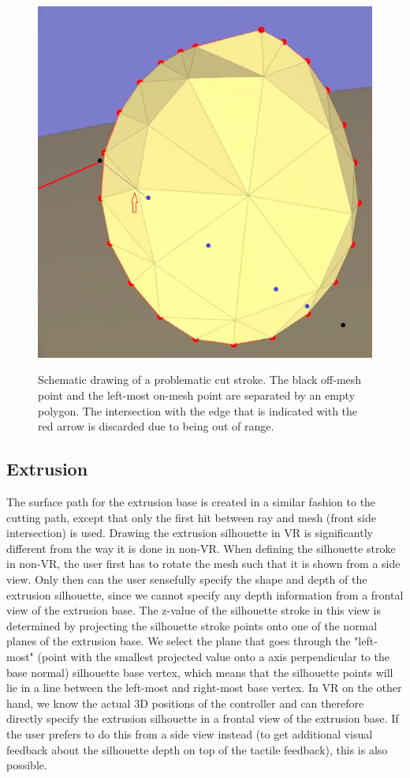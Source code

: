 \begin{figure}[!h]
    \centering
    \includegraphics[width=0.5\linewidth]{figures/schematic_error_cut1}\\
    \caption[Schematic drawing of a problematic cut]{Schematic drawing of a problematic cut stroke. The black off-mesh point and the left-most on-mesh point are separated by an empty polygon. The intersection with the edge that is indicated with the red arrow is discarded due to being out of range.
      \label{fig:schematiccut}}
\end{figure}

\subsection{Extrusion}
The surface path for the extrusion base is created in a similar fashion to the cutting path, except that only the first hit between ray and mesh (front side intersection) is used. Drawing the extrusion silhouette in VR is significantly different from the way it is done in non-VR. When defining the silhouette stroke in non-VR, the user first has to rotate the mesh such that it is shown from a side view. Only then can the user sensefully specify the shape and depth of the extrusion silhouette, since we cannot specify any depth information from a frontal view of the extrusion base. The z-value of the silhouette stroke in this view is determined by projecting the silhouette stroke points onto one of the normal planes of the extrusion base. We select the plane that goes through the "left-most" (point with the smallest projected value onto a axis perpendicular to the base normal) silhouette base vertex, which means that the silhouette points will lie in a line between the left-most and right-most base vertex. 
In VR on the other hand, we know the actual 3D positions of the controller and can therefore directly specify the extrusion silhouette in a frontal view of the extrusion base. If the user prefers to do this from a side view instead (to get additional visual feedback about the silhouette depth on top of the tactile feedback), this is also possible. 

